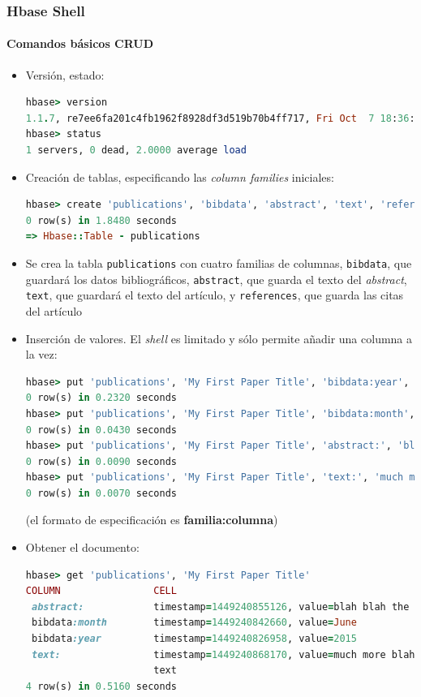 \documentclass[14pt]{beamer}
\begin{document}
\begin{frame}
  \frametitle{Hbase Shell}
\framesubtitle{Comandos básicos CRUD}
\begin{itemize}
\item Versión, estado:

\begin{lstlisting}[language=ruby]
hbase> version
1.1.7, re7ee6fa201c4fb1962f8928df3d519b70b4ff717, Fri Oct  7 18:36:27 PDT 2016
hbase> status
1 servers, 0 dead, 2.0000 average load
\end{lstlisting}

\framebreak

\item Creación de tablas, especificando las {\em column families}
  iniciales:
\begin{lstlisting}[language=ruby]
hbase> create 'publications', 'bibdata', 'abstract', 'text', 'references'
0 row(s) in 1.8480 seconds
=> Hbase::Table - publications
\end{lstlisting}

\item Se crea la tabla {\tt publications} con cuatro familias de columnas,
  {\tt bibdata}, que guardará los datos bibliográficos, {\tt abstract}, que
  guarda el texto del {\em abstract\/}, {\tt text}, que guardará el texto
  del artículo, y {\tt references}, que guarda las citas del artículo

\framebreak

\item Inserción de valores. El {\em shell\/} es limitado y sólo permite
  añadir una columna a la vez:
\begin{lstlisting}[language=ruby,basicstyle=\scriptsize\tt]
hbase> put 'publications', 'My First Paper Title', 'bibdata:year', 2015
0 row(s) in 0.2320 seconds
hbase> put 'publications', 'My First Paper Title', 'bibdata:month', 'June'
0 row(s) in 0.0430 seconds
hbase> put 'publications', 'My First Paper Title', 'abstract:', 'blah blah the abstract'
0 row(s) in 0.0090 seconds
hbase> put 'publications', 'My First Paper Title', 'text:', 'much more blah blah in the text'
0 row(s) in 0.0070 seconds
\end{lstlisting}

  (el formato de especificación es {\bf familia:columna})

\framebreak

\item Obtener el documento:

\begin{lstlisting}[language=ruby,basicstyle=\tiny\tt]
hbase> get 'publications', 'My First Paper Title'
COLUMN                CELL
 abstract:            timestamp=1449240855126, value=blah blah the abstract
 bibdata:month        timestamp=1449240842660, value=June
 bibdata:year         timestamp=1449240826958, value=2015
 text:                timestamp=1449240868170, value=much more blah blah in the
                      text
4 row(s) in 0.5160 seconds
\end{lstlisting}


\end{itemize}
\end{frame}
\end{document}
